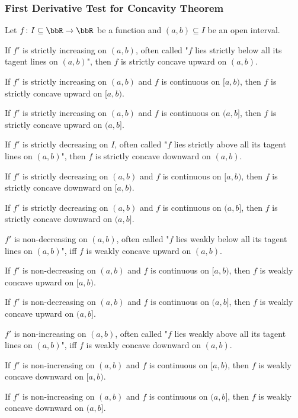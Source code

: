 \subsubsection{First Derivative Test for Concavity Theorem}
Let $f\colon I\subseteq\bbR\to\bbR$ be a function and $(a,b)\subseteq I$ be an open interval.
\bit
\item If $f'$ is strictly increasing on $(a,b)$, often called "$f$ lies strictly below all its tagent lines on $(a,b)$", then $f$ is strictly concave upward on $(a,b)$.
\item If $f'$ is strictly increasing on $(a,b)$ and $f$ is continuous on $[a,b)$, then $f$ is strictly concave upward on $[a,b)$.
\item If $f'$ is strictly increasing on $(a,b)$ and $f$ is continuous on $(a,b]$, then $f$ is strictly concave upward on $(a,b]$.
\item If $f'$ is strictly decreasing on $I$, often called "$f$ lies strictly above all its tagent lines on $(a,b)$", then $f$ is strictly concave downward on $(a,b)$.
\item If $f'$ is strictly decreasing on $(a,b)$ and $f$ is continuous on $[a,b)$, then $f$ is strictly concave downward on $[a,b)$.
\item If $f'$ is strictly decreasing on $(a,b)$ and $f$ is continuous on $(a,b]$, then $f$ is strictly concave downward on $(a,b]$.
\item $f'$ is non-decreasing on $(a,b)$, often called "$f$ lies weakly below all its tagent lines on $(a,b)$", iff $f$ is weakly concave upward on $(a,b)$.
\item If $f'$ is non-decreasing on $(a,b)$ and $f$ is continuous on $[a,b)$, then $f$ is weakly concave upward on $[a,b)$.
\item If $f'$ is non-decreasing on $(a,b)$ and $f$ is continuous on $(a,b]$, then $f$ is weakly concave upward on $(a,b]$.
\item $f'$ is non-increasing on $(a,b)$, often called "$f$ lies weakly above all its tagent lines on $(a,b)$", iff $f$ is weakly concave downward on $(a,b)$.
\item If $f'$ is non-increasing on $(a,b)$ and $f$ is continuous on $[a,b)$, then $f$ is weakly concave downward on $[a,b)$.
\item If $f'$ is non-increasing on $(a,b)$ and $f$ is continuous on $(a,b]$, then $f$ is weakly concave downward on $(a,b]$.
\eit
